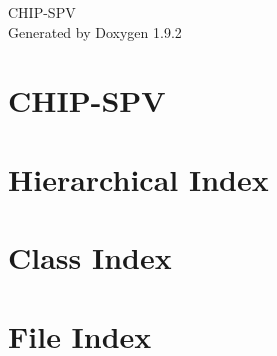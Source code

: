 \documentclass[twoside]{book}
\newcommand{\+}{\discretionary{\mbox{\scriptsize$\hookleftarrow$}}{}{}}
\newcommand{\clearemptydoublepage}{%
    \newpage{\pagestyle{empty}\cleardoublepage}%
  }
\begin{document}
  \raggedbottom
    \hypersetup{pageanchor=false,
                bookmarksnumbered=true,
                pdfencoding=unicode
               }
  \begin{titlepage}
  \vspace*{7cm}
  \begin{center}%
  {\Large CHIP-\/\+SPV}\\
  \vspace*{1cm}
  {\large Generated by Doxygen 1.9.2}\\
  \end{center}
  \end{titlepage}
  \clearemptydoublepage
  \tableofcontents
  \clearemptydoublepage
  \hypersetup{pageanchor=true}
\chapter{CHIP-\/\+SPV}
\label{index}\hypertarget{index}{}
\chapter{Hierarchical Index}

\chapter{Class Index}

\chapter{File Index}

\end{document}
